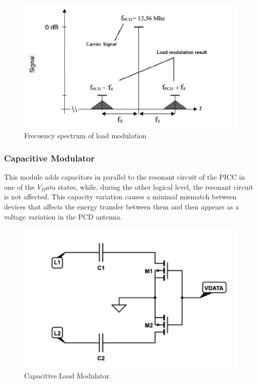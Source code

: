 \documentclass{article} %
\begin{document}
\begin{multicols}{2}
\begin{figure}[H]
\centering
\includegraphics[scale=0.5]{Images/ImagenesTesina/Antecedentes/Modulacion_Carga_2.JPG}
\caption{Frecuency spectrum of load modulation }
\label{fig:Mod_carg}
\end{figure}

\subsubsection{Capacitive Modulator}

This module adds capacitors in parallel to the resonant circuit of the PICC in one of the $V_Data$ states, while, during the other logical level, the resonant circuit is not affected. This capacity variation causes a minimal mismatch between devices that affects the energy transfer between them and then appears as a voltage variation in the PCD antenna.
\begin{figure}[H]
\centering
\includegraphics[scale=0.5]{Images/ImagenesTesina/Antecedentes/Modulacion_Carga_Cap.JPG}
\caption{Capacitive Load Modulator.}
\label{fig:Mod_carg_cap}
\end{figure}


\end{multicols}
\end{document}
